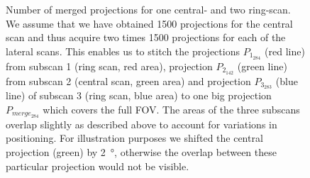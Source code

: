 \begin{figure}%
	\caption{Number of merged projections for one central- and two ring-scan. We assume that we have obtained 1500 projections for the central scan and thus acquire two times 1500 projections for each of the lateral scans. This enables us to stitch the projections $P_{1_{284}}$ %
 		(red line) from subscan 1 (ring scan, red area), projection $P_{2_{142}}$ %
 		(green line) from subscan 2 (central scan, green area) and projection $P_{3_{283}}$ %
 		(blue line) of subscan 3 (ring scan, blue area) to one big projection $P_{merge_{284}}$ %
		which covers the full FOV. The areas of the three subscans overlap slightly as described above to account for variations in positioning. For illustration purposes we shifted the central projection (green) by \SI{2}{\degree}, otherwise the overlap between these particular projection would not be visible.}%
	\label{fig:amount of projections}%
\end{figure}%

